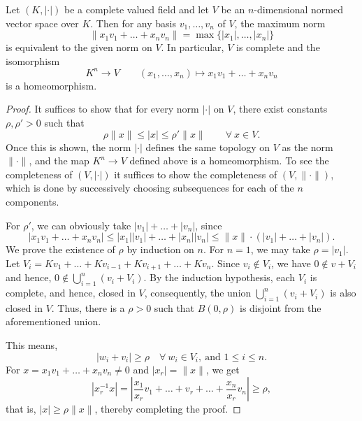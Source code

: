 \begin{theorem}
    Let $(K, |\cdot|)$ be a complete valued field and let $V$ be an $n$-dimensional normed vector space over $K$. Then for any basis $v_1,\dots,v_n$ of $V$, the maximum norm 
    \begin{equation*}
        \|x_1v_1 + \dots + x_nv_n\| = \max\{|x_1|,\dots,|x_n|\}
    \end{equation*}
    is equivalent to the given norm on $V$. In particular, $V$ is complete and the isomorphism 
    \begin{equation*}
        K^n\longrightarrow V\qquad (x_1,\dots,x_n)\longmapsto x_1v_1 + \dots + x_nv_n
    \end{equation*}
    is a homeomorphism.
\end{theorem}
\begin{proof}
    It suffices to show that for every norm $|\cdot|$ on $V$, there exist constants $\rho, \rho' > 0$ such that 
    \begin{equation*}
        \rho\|x\|\le |x|\le\rho'\|x\|\qquad\forall~x\in V.
    \end{equation*}
    Once this is shown, the norm $|\cdot|$ defines the same topology on $V$ as the norm $\|\cdot\|$, and the map $K^n\to V$ defined above is a homeomorphism. To see the completeness of $(V, |\cdot|)$ it suffices to show the completeness of $(V, \|\cdot\|)$, which is done by successively choosing subsequences for each of the $n$ components.

    For $\rho'$, we can obviously take $|v_1| + \dots + |v_n|$, since 
    \begin{equation*}
        |x_1v_1 + \dots + x_nv_n|\le |x_1||v_1| + \dots + |x_n||v_n|\le\|x\|\cdot\left(|v_1| + \dots + |v_n|\right).
    \end{equation*}
    We prove the existence of $\rho$ by induction on $n$. For $n = 1$, we may take $\rho = |v_1|$. Let $V_i = Kv_1 + \dots + Kv_{i - 1} + Kv_{i + 1} + \dots + Kv_n$. Since $v_i\notin V_i$, we have $0\notin v + V_i$ and hence, $0\notin\bigcup\limits_{i = 1}^n (v_i + V_i)$. By the induction hypothesis, each $V_i$ is complete, and hence, closed in $V$, consequently, the union $\bigcup\limits_{i = 1}^n(v_i + V_i)$ is also closed in $V$. Thus, there is a $\rho > 0$ such that $B(0,\rho)$ is disjoint from the aforementioned union.

    This means, 
    \begin{equation*}
        |w_i + v_i|\ge \rho\quad\forall~w_i\in V_i,~\text{and } 1\le i\le n.
    \end{equation*}
    For $x = x_1v_1 + \dots + x_nv_n\ne 0$ and $|x_r| = \|x\|$, we get 
    \begin{equation*}
        |x_r^{-1}x| = \left|\frac{x_1}{x_r}v_1 + \dots + v_r + \dots + \frac{x_n}{x_r}v_n\right|\ge\rho,
    \end{equation*}
    that is, $|x|\ge\rho\|x\|$, thereby completing the proof.
\end{proof}

